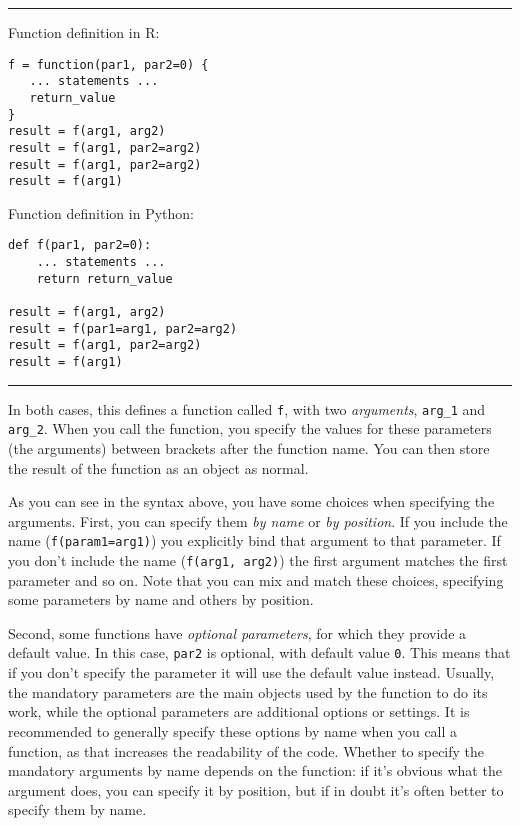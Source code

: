 \noindent\rule{\textwidth}{.5pt}\vspace{-1em}

\noindent\begin{minipage}[t]{.5\textwidth}
  Function definition in R:
\begin{verbatim}
f = function(par1, par2=0) {
   ... statements ... 
   return_value
}
result = f(arg1, arg2)
result = f(arg1, par2=arg2)
result = f(arg1, par2=arg2)
result = f(arg1)
\end{verbatim}
\end{minipage}
\begin{minipage}[t]{.45\textwidth}
  Function definition in Python:
\begin{verbatim}
def f(par1, par2=0):
    ... statements ...
    return return_value   

result = f(arg1, arg2)
result = f(par1=arg1, par2=arg2)
result = f(arg1, par2=arg2)
result = f(arg1)
\end{verbatim}
\end{minipage}
\vspace{.5em}

\noindent\rule{\textwidth}{.5pt}

In both cases, this defines a function called \verb|f|,
with two \emph{arguments}, \verb|arg_1| and \verb|arg_2|.
When you call the function, you specify the values for these parameters (the arguments) between brackets after the function name.
You can then store the result of the function as an object as normal.

As you can see in the syntax above, you have some choices when specifying the arguments.
First, you can specify them \emph{by name} or \emph{by position}.
If you include the name (\verb|f(param1=arg1)|) you explicitly bind that argument to that parameter.
If you don't include the name (\verb|f(arg1, arg2)|) the first argument matches the first parameter and so on.
Note that you can mix and match these choices, specifying some parameters by name and others by position.

Second, some functions have \emph{optional parameters}, for which they provide a default value.
In this case, \verb|par2| is optional, with default value \verb|0|.
This means that if you don't specify the parameter it will use the default value instead.
Usually, the mandatory parameters are the main objects used by the function to do its work,
while the optional parameters are additional options or settings.
It is recommended to generally specify these options by name when you call a function,
as that increases the readability of the code.
Whether to specify the mandatory arguments by name depends on the function:
if it's obvious what the argument does, you can specify it by position,
but if in doubt it's often better to specify them by name. 

